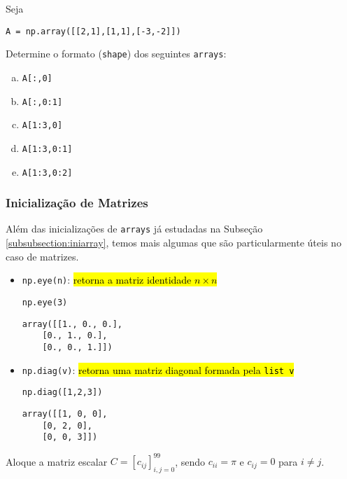 \documentclass[12pt]{article}
\begin{document}
\begin{exr}
  Seja

\begin{lstlisting}
A = np.array([[2,1],[1,1],[-3,-2]])
\end{lstlisting}

  Determine o formato (\texttt{shape}) dos seguintes \texttt{arrays}:
  \begin{enumerate}[a)]
  \item \lstinline+A[:,0]+
  \item \lstinline+A[:,0:1]+
  \item \lstinline+A[1:3,0]+
  \item \lstinline+A[1:3,0:1]+
  \item \lstinline+A[1:3,0:2]+
  \end{enumerate}
\end{exr}

\subsubsection{Inicialização de Matrizes}

Além das inicializações de \texttt{arrays} já estudadas na Subseção \ref{subsubsection:iniarray}, temos mais algumas que são particularmente úteis no caso de matrizes.
\begin{itemize}
\item \lstinline+np.eye(n)+: \hl{retorna a matriz identidade $n\times n$}

\begin{lstlisting}
np.eye(3)
\end{lstlisting}

\begin{verbatim}
array([[1., 0., 0.],
    [0., 1., 0.],
    [0., 0., 1.]])
\end{verbatim}

   \item \lstinline+np.diag(v)+: \hl{retorna uma matriz diagonal formada pela \texttt{list v}}

\begin{lstlisting}
np.diag([1,2,3])
\end{lstlisting}

\begin{verbatim}
array([[1, 0, 0],
    [0, 2, 0],
    [0, 0, 3]])
\end{verbatim}

  \end{itemize}

 \begin{exr}
   Aloque a matriz escalar $C = [c_{ij}]_{i,j=0}^{99}$, sendo $c_{ii}=\pi$ e $c_{ij}=0$ para $i\neq j$.
 \end{exr}
\end{document}
